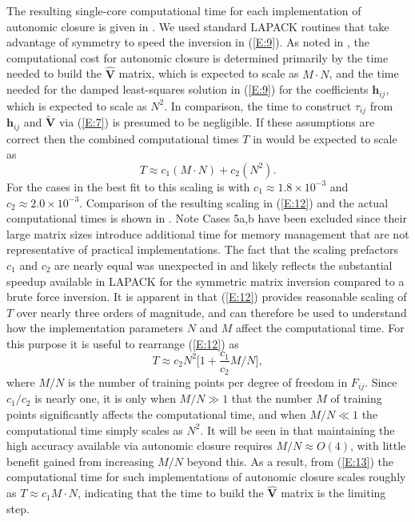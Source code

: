 The resulting single-core computational time for each implementation of autonomic closure is given in . We used standard LAPACK routines that take advantage of symmetry to speed the inversion in (\ref{E:9}). As noted in , the computational cost for autonomic closure is determined primarily by the time needed to build the $\widehat{\mathbf{V}}$  matrix, which is expected to scale as $M \cdot N$, and the time needed for the damped least-squares solution in (\ref{E:9}) for the coefficients $\mathbf{h}_{ij}$, which is expected to scale as $N^2$. In comparison, the time to construct  $\tau_{ij}$ from  $\mathbf{h}_{ij}$  and  $\widetilde{\mathbf{V}}$  via (\ref{E:7}) is presumed to be negligible. If these assumptions are correct then the combined computational times $T$ in  would be expected to scale as
%
\begin{equation}
	\label{E:12}
	T \approx c_1 (M \cdot N) + c_2 (N^2).
\end{equation}
%
%         
For the cases in  the best fit to this scaling is with $c_1 \approx 1.8 \times 10^{-3}$  and  $c_2 \approx 2.0 \times 10^{-3}$. Comparison of the resulting scaling in (\ref{E:12}) and the actual computational times is shown in . Note Cases 5a,b have been excluded since their large matrix sizes introduce additional time for memory management that are not representative of practical implementations. The fact that the scaling prefactors $c_1$  and  $c_2$ are nearly equal was unexpected in  and likely reflects the substantial speedup available in LAPACK for the symmetric matrix inversion compared to a brute force inversion.
It is apparent in  that (\ref{E:12}) provides reasonable scaling of $T$ over nearly three orders of magnitude, and can therefore be used to understand how the implementation parameters $N$ and $M$ affect the computational time. For this purpose it is useful to rearrange (\ref{E:12}) as
%
\begin{equation}
	\label{E:13}
	T \approx c_2 N^2 \bigg[ 1 + \frac{c_1}{c_2} M/N \bigg] ,
\end{equation}
%
%         
where  $M/N$ is the number of training points per degree of freedom in $F_{ij}$. Since $c_1/c_2$  is nearly one, it is only when $M/N \gg 1$  that the number $M$ of training points significantly affects the computational time, and when  $M/N \ll 1$ the computational time simply scales as $N^2$. It will be seen in  that maintaining the high accuracy available via autonomic closure requires $M/N \approx O(4)$, with little benefit gained from increasing $M/N$  beyond this. As a result, from (\ref{E:13}) the computational time for such implementations of autonomic closure scales roughly as $T \approx c_1 M \cdot N$, indicating that the time to build the $\widehat{\mathbf{V}}$ matrix is the limiting step.  

